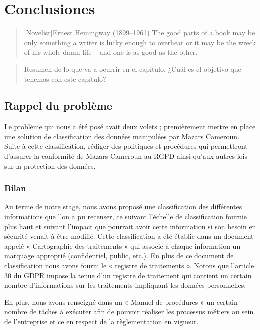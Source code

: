 \chapter{Conclusiones}

\begin{quotation}[Novelist]{Ernest Hemingway (1899--1961)}
The good parts of a book may be only something a writer is lucky enough to overhear or it may be the wreck of his whole damn life -- and one is as good as the other.
\end{quotation}

\begin{abstract}
Resumen de lo que va a ocurrir en el capítulo. ¿Cuál es el objetivo que tenemos con este capítulo?
\end{abstract}

\section{Rappel du problème}

Le problème qui nous a été posé avait deux volets ; premièrement mettre en place une solution de classification des données manipulées par Mazars Cameroun. Suite à cette classification, rédiger des politiques et procédures qui permettront d’assurer la conformité de Mazars Cameroun au RGPD ainsi qu’aux autres lois sur la protection des données.

\subsection{Bilan}
Au terme de notre stage, nous avons proposé une classification des différentes informations que l’on a pu recenser, ce suivant l’échelle de classification fournie plus haut et suivant l’impact que pourrait avoir cette information si son besoin en sécurité venait à être modifié. Cette classification a été établie dans un document appelé « Cartographie des traitements » qui associe à chaque information un marquage approprié (confidentiel, public, etc.). En plus de ce document de classification nous avons fourni le « registre de traitements ». Notons que l’article 30 du GDPR impose la tenue d’un registre de traitement qui contient un certain nombre d’informations sur les traitements impliquant les données personnelles. 

En plus, nous avons renseigné dans un « Manuel de procédures » un certain nombre de tâches à exécuter afin de pouvoir réaliser les processus métiers au sein de l’entreprise et ce en respect de la règlementation en vigueur. 

